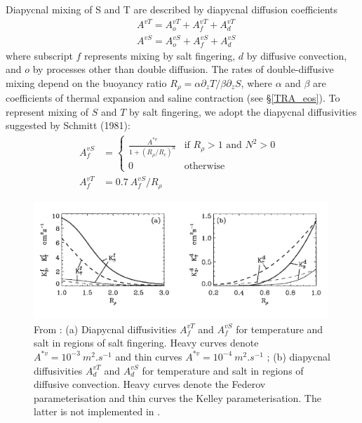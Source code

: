 Diapycnal mixing of S and T are described by diapycnal diffusion coefficients 
\begin{align*} %
    &A^{vT} = A_o^{vT}+A_f^{vT}+A_d^{vT}	\\
    &A^{vS} = A_o^{vS}+A_f^{vS}+A_d^{vS}
\end{align*}
where subscript $f$ represents mixing by salt fingering, $d$ by diffusive convection, 
and $o$ by processes other than double diffusion. The rates of double-diffusive 
mixing depend on the buoyancy ratio $R_\rho = \alpha \partial_z T / \beta \partial_z S$, 
where $\alpha$ and $\beta$ are coefficients of thermal expansion and saline 
contraction (see \S\ref{TRA_eos}). To represent mixing of $S$ and $T$ by salt 
fingering, we adopt the diapycnal diffusivities suggested by Schmitt (1981):
\begin{align} \label{Eq_zdfddm_f}
A_f^{vS} &= 	\begin{cases}
	\frac{A^{\ast v}}{1+(R_\rho / R_c)^n   } &\text{if  $R_\rho > 1$ and $N^2>0$ } \\
	0 				  					    &\text{otherwise} 
				\end{cases}   
\\ 		    \label{Eq_zdfddm_f_T}
A_f^{vT} &= 0.7 \ A_f^{vS} / R_\rho 
\end{align}

\begin{figure}[!t]   \begin{center}
\includegraphics[width=0.99\textwidth]{./TexFiles/Figures/Fig_zdfddm.pdf}
\caption{  \label{Fig_zdfddm}
From \citet{Merryfield1999} : (a) Diapycnal diffusivities $A_f^{vT}$ 
and $A_f^{vS}$ for temperature and salt in regions of salt fingering. Heavy 
curves denote $A^{\ast v} = 10^{-3}~m^2.s^{-1}$ and thin curves 
$A^{\ast v} = 10^{-4}~m^2.s^{-1}$ ; (b) diapycnal diffusivities $A_d^{vT}$ and 
$A_d^{vS}$ for temperature and salt in regions of diffusive convection. Heavy 
curves denote the Federov parameterisation and thin curves the Kelley 
parameterisation. The latter is not implemented in \NEMO. }
\end{center}    \end{figure}

